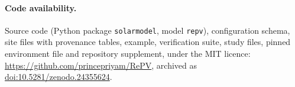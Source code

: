 \documentclass[11pt]{article}
\begin{document}
\paragraph{Code availability.}
Source code (Python package \texttt{solarmodel}, model \texttt{repv}), configuration schema, site files with provenance tables, example, verification suite, study files, pinned environment file and repository supplement, under the MIT licence: \url{https://github.com/princepriyam/RePV}, archived as \href{https://doi.org/10.5281/zenodo.24355624}{doi:10.5281/zenodo.24355624}.


\end{document}
